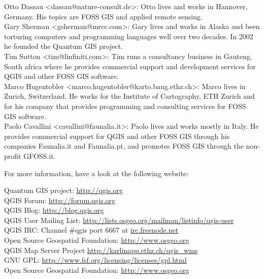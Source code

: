 Otto Dassau <dassau@nature-consult.de>: Otto lives and works in Hannover,
Germany. His topics are FOSS GIS and applied remote sensing.
\\Gary Sherman <gsherman@mrcc.com>: Gary lives and works in Alaska and been
torturing computers and programming languages well over two decades. In 2002
he founded the Quantum GIS project.
\\Tim Sutton <tim@linfiniti.com>: Tim runs a consultancy business in
Gauteng, South africa where he provides commercial support and development
services for QGIS and other FOSS GIS software.
\\Marco Hugentobler <marco.hugentobler@karto.baug.ethz.ch>: Marco lives in
Zurich, Switzerland. He works for the Institute of Cartography, ETH Zurich
and for his company that provides programming and consulting services for
FOSS GIS software.
\\Paolo Cavallini <cavallini@faunalia.it>: Paolo lives and works mostly in Italy. He
provides commercial support for QGIS and other FOSS GIS through his companies
Faunalia.it and Faunalia.pt, and promotes FOSS GIS through the non-profit
GFOSS.it.


For more information, have a look at the following website:

Quantum GIS project: \url{http://qgis.org}
\\QGIS Forum: \url{http://forum.qgis.org}
\\QGIS Blog: \url{http://blog.qgis.org}
\\QGIS User Mailing List:
\url{http://lists.osgeo.org/mailman/listinfo/qgis-user}
\\QGIS IRC: Channel \#qgis port 6667 at \url{irc.freenode.net}
\\Open Source Geospatial Foundation: \url{http://www.osgeo.org}
\\QGIS Map Server Project \url{http://karlinapp.ethz.ch/qgis\_wms}
\\GNU GPL: \url{http://www.fsf.org/licensing/licenses/gpl.html}
\\Open Source Geospatial Foundation: \url{http://www.osgeo.org}



